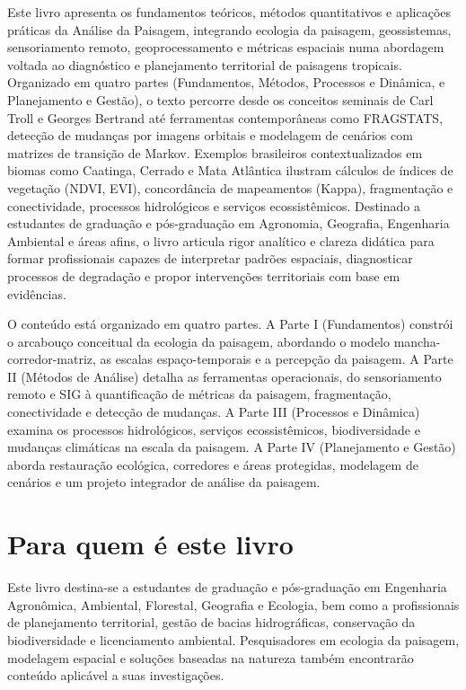 \documentclass[
  portuguese,
  11pt,
  a4paper,
  open=any]{scrbook}
\begin{document}
Este livro apresenta os fundamentos teóricos, métodos quantitativos e
aplicações práticas da Análise da Paisagem, integrando ecologia da
paisagem, geossistemas, sensoriamento remoto, geoprocessamento e
métricas espaciais numa abordagem voltada ao diagnóstico e planejamento
territorial de paisagens tropicais. Organizado em quatro partes
(Fundamentos, Métodos, Processos e Dinâmica, e Planejamento e Gestão), o
texto percorre desde os conceitos seminais de Carl Troll e Georges
Bertrand até ferramentas contemporâneas como FRAGSTATS, detecção de
mudanças por imagens orbitais e modelagem de cenários com matrizes de
transição de Markov. Exemplos brasileiros contextualizados em biomas
como Caatinga, Cerrado e Mata Atlântica ilustram cálculos de índices de
vegetação (NDVI, EVI), concordância de mapeamentos (Kappa), fragmentação
e conectividade, processos hidrológicos e serviços ecossistêmicos.
Destinado a estudantes de graduação e pós-graduação em Agronomia,
Geografia, Engenharia Ambiental e áreas afins, o livro articula rigor
analítico e clareza didática para formar profissionais capazes de
interpretar padrões espaciais, diagnosticar processos de degradação e
propor intervenções territoriais com base em evidências.

O conteúdo está organizado em quatro partes. A Parte I (Fundamentos)
constrói o arcabouço conceitual da ecologia da paisagem, abordando o
modelo mancha-corredor-matriz, as escalas espaço-temporais e a percepção
da paisagem. A Parte II (Métodos de Análise) detalha as ferramentas
operacionais, do sensoriamento remoto e SIG à quantificação de métricas
da paisagem, fragmentação, conectividade e detecção de mudanças. A Parte
III (Processos e Dinâmica) examina os processos hidrológicos, serviços
ecossistêmicos, biodiversidade e mudanças climáticas na escala da
paisagem. A Parte IV (Planejamento e Gestão) aborda restauração
ecológica, corredores e áreas protegidas, modelagem de cenários e um
projeto integrador de análise da paisagem.

\section*{Para quem é este livro}\label{para-quem-uxe9-este-livro}


Este livro destina-se a estudantes de graduação e pós-graduação em
Engenharia Agronômica, Ambiental, Florestal, Geografia e Ecologia, bem
como a profissionais de planejamento territorial, gestão de bacias
hidrográficas, conservação da biodiversidade e licenciamento ambiental.
Pesquisadores em ecologia da paisagem, modelagem espacial e soluções
baseadas na natureza também encontrarão conteúdo aplicável a suas
investigações.
\end{document}
